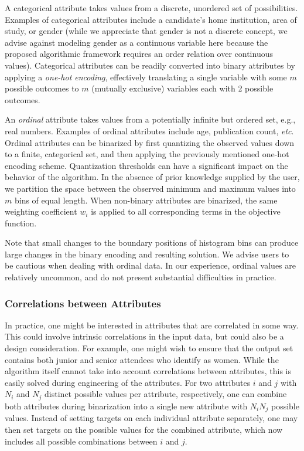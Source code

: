 \documentclass[12pt]{article}
\begin{document}
A categorical attribute takes values from a discrete, unordered set of possibilities.
Examples of categorical attributes include a candidate's home institution, area of study, or gender (while we appreciate that gender is not a discrete concept, we advise against modeling gender as a continuous variable here because the proposed algorithmic framework requires an order relation over continuous values).
Categorical attributes can be readily converted into binary attributes by applying a \emph{one-hot encoding}, effectively translating a single variable with some $m$ possible outcomes to $m$ (mutually exclusive) variables each with 2 possible outcomes.

An \emph{ordinal} attribute takes values from a potentially infinite but ordered set, e.g., real numbers.
Examples of ordinal attributes include age, publication count, \emph{etc}.
Ordinal attributes can be binarized by first quantizing the observed values down to a finite, categorical set, and then applying the previously mentioned one-hot encoding scheme.
Quantization thresholds can have a significant impact on the behavior of the algorithm.
In the absence of prior knowledge supplied by the user, we partition the space between the observed minimum and maximum values into $m$ bins of equal length.
When non-binary attributes are binarized, the same weighting coefficient $w_i$ is applied to all corresponding terms in the objective function.

\begin{bf}
Note that small changes to the boundary positions of histogram bins can produce large changes in the binary encoding and resulting solution.
We advise users to be cautious when dealing with ordinal data.
In our experience, ordinal values are relatively uncommon, and do not present substantial difficulties in practice.
\end{bf}

\subsubsection*{Correlations between Attributes}

In practice, one might be interested in attributes that are correlated in some way. This could involve intrinsic correlations in the input data, but could also be a design consideration. For example, one might wish to ensure that the output set contains both junior and senior attendees who identify as women. While the algorithm itself cannot take into account correlations between attributes, this is easily solved during engineering of the attributes. For two attributes $i$ and $j$ with $N_i$ and $N_j$ distinct possible values per attribute, respectively, one can combine both attributes during binarization into a single new attribute with $N_i N_j$ possible values. Instead of setting targets on each individual attribute separately, one may then set targets on the possible values for the combined attribute, which now includes all possible combinations between $i$ and $j$.  
\end{document}
